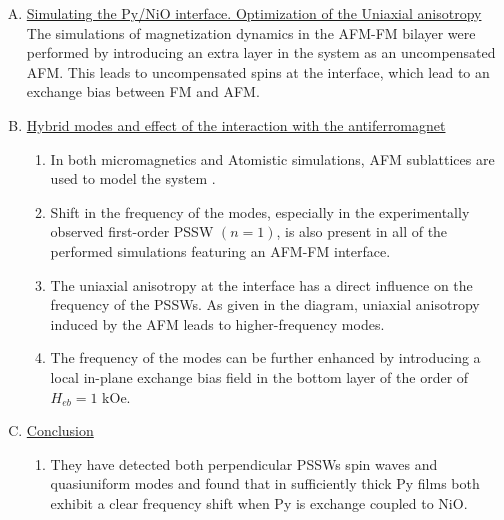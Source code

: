\begin{enumerate}[A.]
    \item \underline{Simulating the Py/NiO interface. Optimization of the Uniaxial anisotropy}\\
    The simulations of magnetization dynamics in the AFM-FM bilayer were performed by introducing an extra layer in the system as an uncompensated AFM. This leads to uncompensated spins at the interface, which lead to an exchange bias between FM and AFM.
    \item \underline{Hybrid modes and effect of the interaction with the antiferromagnet}
    \begin{enumerate}[1.]
        \item In both micromagnetics and Atomistic simulations, AFM sublattices are used to model the system \cite{jenkinsAtomisticOriginAthermal2021,jenkinsAtomisticOriginExchange2020}.
        \item Shift in the frequency of the modes, especially in the experimentally observed first-order PSSW $(n=1)$, is also present in all of the performed simulations featuring an AFM-FM interface.
        \item The uniaxial anisotropy at the interface has a direct influence on the frequency of the PSSWs. As given in the diagram, uniaxial anisotropy induced by the AFM leads to higher-frequency modes.
        \item The frequency of the modes can be further enhanced by introducing a local in-plane exchange bias field in the bottom layer of the order of $H_{eb}=1$ kOe. 
    \end{enumerate}
    \item \underline{Conclusion}
    \begin{enumerate}[1.]
        \item They have detected both perpendicular PSSWs spin waves and quasiuniform modes and found that in sufficiently thick Py films both exhibit a clear frequency shift when Py is exchange coupled to NiO.
    \end{enumerate}
\end{enumerate}